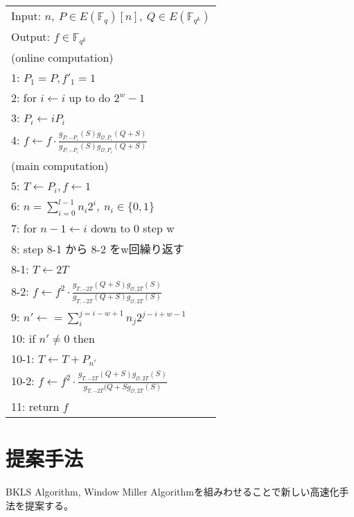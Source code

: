\documentclass[twocolumn]{jsarticle} %
\begin{document}
\begin{longtable}
 \begin{center}
  \begin{tabular}{|l|}
     \hline
Input: $n, \ P \in E(\mathbb{F}_q)[n], \ Q \in E(\mathbb{F}_{q^k})$ \\
Output: $f \in \mathbb{F}_{q^k}$  \\
     \hline
(online computation) \\
1: \quad $P_1 = P, f'_1=1 $\\
2: \quad for $i \gets i$ up to do $2^w -1$\\
3: \quad \quad $P_i \gets iP_i $\\
4: \quad \quad $f \gets f \cdot \frac{g_{P,-P_i}(S)g_{\mathcal{O},P_i}(Q+S)}{g_{P,-P_i}(S)g_{\mathcal{O},P_i}(Q+S)}$ \\
(main computation) \\
5: \quad $T \gets P_i, f \gets 1 $\\
6: \quad $n=\sum^{l - 1}_{i=0} n_i 2^i, \ n_i \in \{0,1\}$\\
7: \quad for $ n-1 \gets i$ down to 0 step w\\
8: \quad step 8-1 から 8-2 をw回繰り返す\\
8-1: \quad \quad $T \gets 2T $\\
8-2: \quad \quad $f \gets f^2 \cdot \frac{g_{T,-2T}(Q+S)g_{\mathcal{O},2T}(S)}{g_{T,-2T}(Q+S)g_{\mathcal{O},2T}(S)}$\\
9: \quad $n' \gets =\sum^{j=i-w+1}_{i} n_{j}2^{j-i+w-1} $\\
10: \quad if $n' \neq 0$ then\\
10-1: \quad \quad $T \gets T + P_{n'} $\\
10-2: \quad \quad $f \gets f^2 \cdot \frac{g_{T,-2T}(Q+S)g_{\mathcal{O},2T}(S)}{g_{T,-2T}(Q+Sg_{\mathcal{O},2T}(S)}$ \\
11: \quad return $f$\\
     \hline
   \end{tabular}
 \end{center}
\end{longtable}


\section{提案手法}
BKLS Algorithm, Window Miller Algorithmを組みわせることで新しい高速化手法を提案する。
\end{document}
